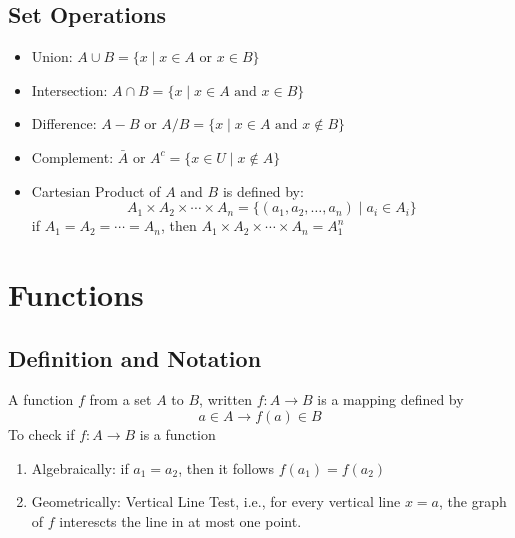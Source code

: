 \documentclass[11pt]{article}
\begin{document}
\subsection{Set Operations}
\begin{itemize}
    \item Union: $A\cup B = \{x \mid x \in A \text{ or } x \in B\}$ 
    \item Intersection: $A\cap B = \{x \mid x \in A \text{ and } x \in B\}$ 
    \item Difference: $A - B \text{ or }A/B = \{x \mid x \in A \text{ and } x \notin B\}$
    \item Complement: $\bar{A} \text{ or } A^c = \{x \in U \mid x \notin A\}$
    \item Cartesian Product of $A$ and $B$ is defined by:
        \[
            A_1\times A_2 \times \cdots \times A_n  = \{ (a_1, a_2, \dots, a_n) \mid a_i \in A_i \}
        \]
        if $A_1 = A_2 = \cdots = A_n$, then $A_1\times A_2 \times \cdots \times A_n = A_{1}^n$
    \end{itemize}
\section{Functions}
\subsection{Definition and Notation}
A function $f$ from a set $A$ to $B$, written $f: A\to B$ is a mapping defined by
\[
    a \in A \to f(a) \in B
\]
To check if $f: A\to B$ is a function
\begin{enumerate}
    \item Algebraically: if $a_1 = a_2$, then it follows $f(a_1) = f(a_2)$
    \item Geometrically: Vertical Line Test, i.e., for every vertical line $x = a$, the graph of $f$ interescts the line in at most one point.
\end{enumerate}
\end{document}
